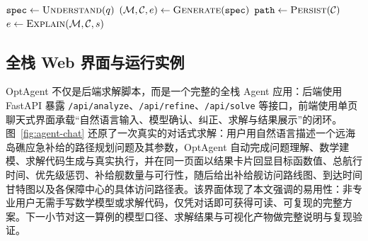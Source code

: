 \documentclass[11pt]{article}
\begin{document}
\begin{algorithm}[t]
\small
\caption{OptAgent 端到端求解流程}
\label{alg:optagent}
$\texttt{spec} \leftarrow \textsc{Understand}(q)$ 
$(\mathcal{M},\mathcal{C},e) \leftarrow \textsc{Generate}(\texttt{spec})$ 
$\texttt{path} \leftarrow \textsc{Persist}(\mathcal{C})$ 
$e \leftarrow \textsc{Explain}(\mathcal{M},\mathcal{C},s)$ 
\end{algorithm}

\subsection{全栈 Web 界面与运行实例}
OptAgent 不仅是后端求解脚本，而是一个完整的全栈 Agent 应用：后端使用 FastAPI 暴露 \texttt{/api/analyze}、\texttt{/api/refine}、\texttt{/api/solve} 等接口，前端使用单页聊天式界面承载“自然语言输入、模型确认、纠正、求解与结果展示”的闭环。图~\ref{fig:agent-chat} 还原了一次真实的对话式求解：用户用自然语言描述一个远海岛礁应急补给的路径规划问题及其参数，OptAgent 自动完成问题理解、数学建模、求解代码生成与真实执行，并在同一页面以结果卡片回显目标函数值、总航行时间、优先级惩罚、补给舰数量与可行性，随后给出补给舰访问路线图、到达时间甘特图以及各保障中心的具体访问路径表。该界面体现了本文强调的易用性：非专业用户无需手写数学模型或求解代码，仅凭对话即可获得可读、可复现的完整方案。下一小节对这一算例的模型口径、求解结果与可视化产物做完整说明与复现验证。
\end{document}
